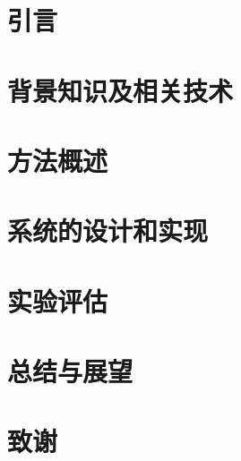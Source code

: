 \documentclass[type=master, oneside]{fduthesis}
\begin{document}
\mainmatter

\chapter{引言}


\chapter{背景知识及相关技术}


\chapter{方法概述}


\chapter{系统的设计和实现}


\chapter{实验评估}


\chapter{总结与展望}


\backmatter

\renewcommand\refname{参考文献}



\chapter{致谢}


\end{document}
